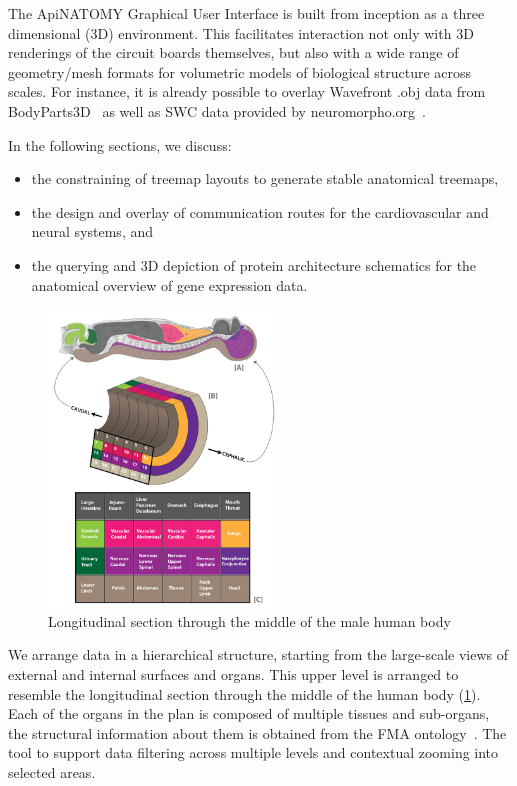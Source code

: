 The ApiNATOMY Graphical User Interface is built from inception as a three dimensional (3D) environment. This facilitates interaction not only with 3D renderings of the circuit boards themselves, but also with a wide range of geometry/mesh formats for volumetric models of biological structure across scales. For instance, it is already possible to overlay Wavefront .obj data from BodyParts3D~\cite{MFT+09} as well as SWC data provided by neuromorpho.org~\cite{Asc06}.

In the following sections, we discuss:
\begin{itemize}
  \item the constraining of treemap layouts to generate stable anatomical treemaps,
  \item the design and overlay of communication routes for the cardiovascular and neural systems, and
  \item the querying and 3D depiction of protein architecture schematics for the anatomical overview of gene expression data.
\end{itemize}

\begin{figure}
	\centering
	\includegraphics[width=6cm]{images/application.png}
	\caption{Longitudinal section through the middle of the male human body}
	\label{fig:application}
\end{figure}

We arrange data in a hierarchical structure, starting from the large-scale views of external and internal surfaces and organs.
This upper level is arranged to resemble the longitudinal section through the middle of the human body (\cref{fig:application}).
Each of the organs in the plan is composed of multiple tissues and sub-organs, the structural information about them is obtained from the FMA ontology~\cite{RM03}. The tool to support data filtering across multiple levels and contextual zooming into selected areas.
